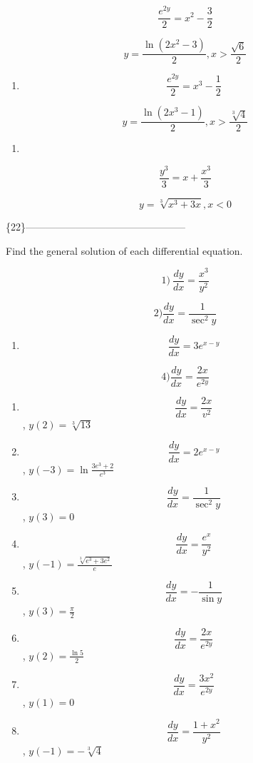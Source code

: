 \documentclass[
]{article}
\providecommand{\tightlist}{%
  \setlength{\itemsep}{0pt}\setlength{\parskip}{0pt}}
\begin{document}
\[\frac{e^{2y}}{2} = x^2 - \frac{3}{2}\]

\[y = \frac{\ln(2x^2 - 3)}{2}, x > \frac{\sqrt{6}}{2}\]

\begin{enumerate}
\def\labelenumi{\arabic{enumi})}
\setcounter{enumi}{10}
\tightlist
\item
  \[\frac{e^{2y}}{2} = x^3 - \frac{1}{2}\]
\end{enumerate}

\[y = \frac{\ln(2x^3 - 1)}{2}, x > \frac{\sqrt[3]{4}}{2}\]

\begin{enumerate}
\def\labelenumi{\arabic{enumi})}
\setcounter{enumi}{11}
\tightlist
\item
\end{enumerate}

\[\frac{y^3}{3} = x + \frac{x^3}{3}\]

\[y = \sqrt[3]{x^3 + 3x}, x < 0\]

\{22\}------------------------------------------------

Find the general solution of each differential equation.

\[1) \ \frac{dy}{dx} = \frac{x^3}{y^2}\]

\[2) \frac{dy}{dx} = \frac{1}{\sec^2 y}\]

\begin{enumerate}
\def\labelenumi{\arabic{enumi})}
\setcounter{enumi}{2}
\tightlist
\item
  \[\frac{dy}{dx} = 3e^{x-y}\]
\end{enumerate}

\[4) \frac{dy}{dx} = \frac{2x}{e^{2y}}\]

\begin{enumerate}
\def\labelenumi{\arabic{enumi})}
\setcounter{enumi}{4}
\item
  \[\frac{dy}{dx} = \frac{2x}{v^2}\] , \(y(2) = \sqrt[3]{13}\)
\item
  \[\frac{dy}{dx} = 2e^{x-y}\] , \(y(-3) = \ln \frac{3e^3 + 2}{e^3}\)
\item
  \[\frac{dy}{dx} = \frac{1}{\sec^2 y}\] , \(y(3) = 0\)
\item
  \[\frac{dy}{dx} = \frac{e^x}{y^2}\] ,
  \(y(-1) = \frac{\sqrt[3]{e^3 + 3e^2}}{e}\)
\item
  \[\frac{dy}{dx} = -\frac{1}{\sin y}\] , \(y(3) = \frac{\pi}{2}\)
\item
  \[\frac{dy}{dx} = \frac{2x}{e^{2y}}\] , \(y(2) = \frac{\ln 5}{2}\)
\item
  \[\frac{dy}{dx} = \frac{3x^2}{e^{2y}}\] , \(y(1) = 0\)
\item
  \[\frac{dy}{dx} = \frac{1+x^2}{y^2}\] , \(y(-1) = -\sqrt[3]{4}\)
\end{enumerate}
\end{document}
